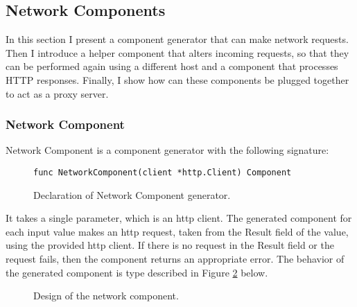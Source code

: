 \subsection{Network Components}
In this section I present a component generator that can make network
requests. Then I introduce a helper component that alters incoming 
requests, so that they can be performed again using a different host
and a component that processes HTTP responses. Finally, I show how
can these components be plugged together to act as a proxy server. 

\subsubsection{Network Component}
Network Component is a component generator with the following signature:
\begin{figure}[h]
\centering
\begin{lstlisting}
func NetworkComponent(client *http.Client) Component
\end{lstlisting}
\caption[scale=1.0]{Declaration of Network Component generator.}
\label{fig:NetworkComponent}
\end{figure}

It takes a single parameter, which is an http client.
The generated component for each input value makes an http request,
taken from the Result field of the value, using the provided http client.
If there is no request in the Result field or the request fails, then
the component returns an appropriate error. The behavior of the generated 
component is type described in Figure \ref{fig:networkComp}
below.

\begin{figure}[h]
\centering
{}
\caption[scale=1.0]{Design of the network component.}
\label{fig:networkComp}
\end{figure}

